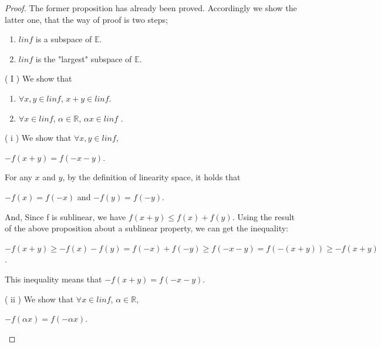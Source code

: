 \documentclass[a4paper,11pt]{jsarticle}
\begin{document}
\begin{proof}
  The former proposition has already been proved. Accordingly we show the latter one, that the way of proof is two steps;

  \begin{enumerate}[label=\Roman*,align=CenterWithParen]
    \item $lin f$ is a subspace of $\mathbb{E}$.
    \item $lin f$ is the "largest" subspace of $\mathbb{E}$.
  \end{enumerate}

  ( $\mathrm{I}$ ) We show that

  \begin{enumerate}[label=\roman*,align=CenterWithParen]
    \item $\forall x, y \in lin f$, $x + y \in lin f$.
    \item $\forall x \in lin f$, $\alpha \in{\mathbb{R}}$, $\alpha x \in lin f$ .
  \end{enumerate}

  ( $\mathrm{i}$ ) We show that $\forall x, y \in lin f$,

  \begin{center}
    $-f(x+y) = f(-x-y)$.
  \end{center}

  For any $x$ and $y$, by the definition of linearity space, it holds that

  \begin{center}
    $-f(x) = f(-x)$ and
    $-f(y) = f(-y)$.
  \end{center}

  And, Since f is sublinear, we have $f(x + y) \leq f(x) + f(y)$. Using the result of the above proposition about a sublinear property, we can get the inequality:

  \begin{center}
    $-f(x+y) \geq - f(x) - f(y) = f(-x) + f(-y) \geq f(-x-y) = f(-(x+y)) \geq -f(x+y)$.
  \end{center}

  This inequality means that $-f(x+y) = f(-x-y)$.

  ( $\mathrm{ii}$ ) We show that $\forall x \in lin f$, $\alpha \in{\mathbb{R}}$,

  \begin{center}
    $-f(\alpha x) = f(-\alpha x)$.
  \end{center}




\end{proof}
\end{document}
